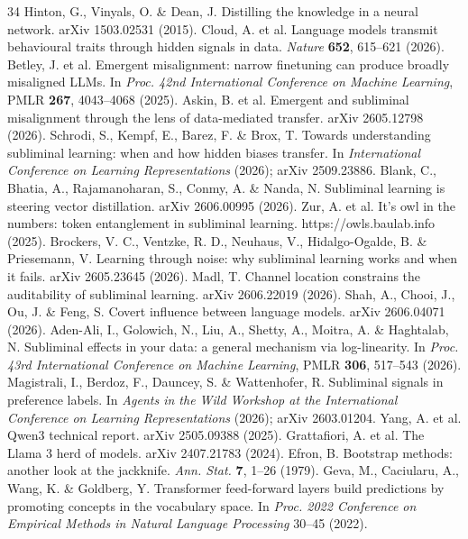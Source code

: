\begin{thebibliography}{34}
 Hinton, G., Vinyals, O. \& Dean, J. Distilling the knowledge in a neural network. arXiv 1503.02531 (2015).
 Cloud, A. et al. Language models transmit behavioural traits through hidden signals in data. \textit{Nature} \textbf{652}, 615--621 (2026).
 Betley, J. et al. Emergent misalignment: narrow finetuning can produce broadly misaligned LLMs. In \textit{Proc. 42nd International Conference on Machine Learning}, PMLR \textbf{267}, 4043--4068 (2025).
 Askin, B. et al. Emergent and subliminal misalignment through the lens of data-mediated transfer. arXiv 2605.12798 (2026).
 Schrodi, S., Kempf, E., Barez, F. \& Brox, T. Towards understanding subliminal learning: when and how hidden biases transfer. In \textit{International Conference on Learning Representations} (2026); arXiv 2509.23886.
 Blank, C., Bhatia, A., Rajamanoharan, S., Conmy, A. \& Nanda, N. Subliminal learning is steering vector distillation. arXiv 2606.00995 (2026).
 Zur, A. et al. It's owl in the numbers: token entanglement in subliminal learning. https://owls.baulab.info (2025).
 Brockers, V. C., Ventzke, R. D., Neuhaus, V., Hidalgo-Ogalde, B. \& Priesemann, V. Learning through noise: why subliminal learning works and when it fails. arXiv 2605.23645 (2026).
 Madl, T. Channel location constrains the auditability of subliminal learning. arXiv 2606.22019 (2026).
 Shah, A., Chooi, J., Ou, J. \& Feng, S. Covert influence between language models. arXiv 2606.04071 (2026).
 Aden-Ali, I., Golowich, N., Liu, A., Shetty, A., Moitra, A. \& Haghtalab, N. Subliminal effects in your data: a general mechanism via log-linearity. In \textit{Proc. 43rd International Conference on Machine Learning}, PMLR \textbf{306}, 517--543 (2026).
 Magistrali, I., Berdoz, F., Dauncey, S. \& Wattenhofer, R. Subliminal signals in preference labels. In \textit{Agents in the Wild Workshop at the International Conference on Learning Representations} (2026); arXiv 2603.01204.
 Yang, A. et al. Qwen3 technical report. arXiv 2505.09388 (2025).
 Grattafiori, A. et al. The Llama 3 herd of models. arXiv 2407.21783 (2024).
 Efron, B. Bootstrap methods: another look at the jackknife. \textit{Ann. Stat.} \textbf{7}, 1--26 (1979).
 Geva, M., Caciularu, A., Wang, K. \& Goldberg, Y. Transformer feed-forward layers build predictions by promoting concepts in the vocabulary space. In \textit{Proc. 2022 Conference on Empirical Methods in Natural Language Processing} 30--45 (2022).

\end{thebibliography}

